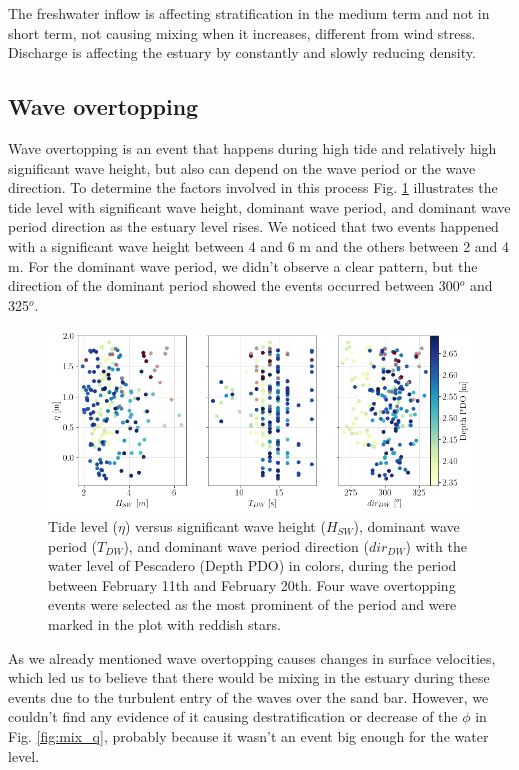 \documentclass[tesis.tex]{subfiles}
\begin{document}
The freshwater inflow is affecting stratification in the medium term and not in short term, not causing mixing when it increases, different from wind stress. Discharge is affecting the estuary by constantly and slowly reducing density.\\

\subsection{Wave overtopping}

Wave overtopping is an event that happens during high tide and relatively high significant wave height, but also can depend on the wave period or the wave direction. To determine the factors involved in this process Fig. \ref{fig:WO} illustrates the tide level with significant wave height, dominant wave period, and dominant wave period direction as the estuary level rises. We noticed that two events happened with a significant wave height between 4 and 6 m and the others between 2 and 4 m. For the dominant wave period, we didn't observe a clear pattern, but the direction of the dominant period showed the events occurred between 300$^o$ and 325$^o$. \\

\begin{figure}[h!]
    \centering
    \includegraphics[width=\textwidth]{Imagenes/WO.png}
    \caption{Tide level ($\eta$) versus significant wave height ($H_{SW}$), dominant wave period ($T_{DW}$), and dominant wave period direction ($dir_{DW}$) with the water level of Pescadero (Depth PDO) in colors, during the period between February 11th and February 20th. Four wave overtopping events were selected as the most prominent of the period and were marked in the plot with reddish stars. }
    \label{fig:WO}
\end{figure}

As we already mentioned wave overtopping causes changes in surface velocities, which led us to believe that there would be mixing in the estuary during these events due to the turbulent entry of the waves over the sand bar. However, we couldn't find any evidence of it causing destratification or decrease of the $\phi$ in Fig. \ref{fig:mix_q}, probably because it wasn't an event big enough for the water level. \\
\end{document}
